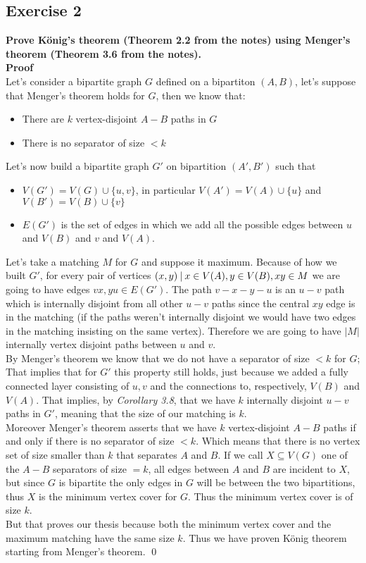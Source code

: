 \subsection*{Exercise 2}
\textbf{Prove König’s theorem (Theorem 2.2 from the notes) using Menger’s theorem (Theorem 3.6 from the notes).\\\linebreak Proof\\}
\unboldmath
Let's consider a bipartite graph $G$ defined on a bipartiton $(A, B)$, let's suppose that Menger's theorem holds for $G$, then we know that:
\begin{itemize}
    \item There are $k$ vertex-disjoint $A-B$ paths in $G$
    \item There is no separator of size $< k$
\end{itemize}
Let's now build a bipartite graph $G'$ on bipartition $(A', B')$ such that 
\begin{itemize}
    \item $V(G') = V(G) \cup \{u, v\}$, in particular $V(A') = V(A) \cup \{u\}$ and $V(B') = V(B) \cup \{v\}$
    \item $E(G')$ is the set of edges in which we add all the possible edges between $u$ and $V(B)$ and $v$ and $V(A)$.
\end{itemize}
Let's take a matching $M$ for $G$ and suppose it maximum. Because of how we built $G'$, for every pair of vertices $(x, y) \:|\: x \in V(A), y \in V(B), xy \in M$ we are going to have edges $vx, yu \in E(G')$. The path $v-x-y-u$ is an $u-v$ path which is internally disjoint from all other $u-v$ paths since the central $xy$ edge is in the matching (if the paths weren't internally disjoint we would have two edges in the matching insisting on the same vertex). Therefore we are going to have $|M|$ internally vertex disjoint paths between $u$ and $v$.\\\linebreak
By Menger's theorem we know that we do not have a separator of size $< k$ for $G$; That implies that for $G'$ this property still holds, just because we added a fully connected layer consisting of $u, v$ and the connections to, respectively, $V(B)$ and $V(A)$. That implies, by \textit{Corollary 3.8}, that we have $k$ internally disjoint $u - v$ paths in $G'$, meaning that the size of our matching is $k$.\\\linebreak
Moreover Menger's theorem asserts that we have $k$ vertex-disjoint $A-B$ paths if and only if there is no separator of size $< k$. Which means that there is no vertex set of size smaller than $k$ that separates $A$ and $B$. If we call $X \subseteq V(G)$ one of the $A-B$ separators of size $= k$,  all edges between $A$ and $B$ are incident to $X$, but since $G$ is bipartite the only edges in $G$ will be between the two bipartitions, thus $X$ is the minimum vertex cover for $G$. Thus the minimum vertex cover is of size $k$.\\\linebreak
But that proves our thesis because both the minimum vertex cover and the maximum matching have the same size $k$. Thus we have proven König theorem starting from Menger's theorem. \qed